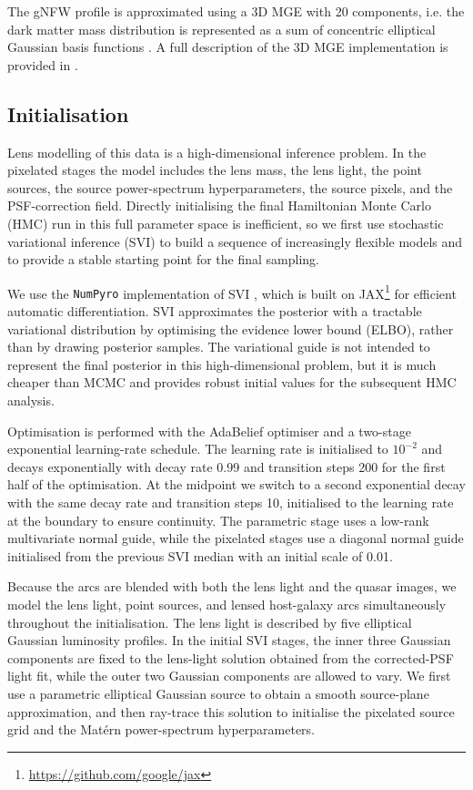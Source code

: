 \documentclass[fleqn,usenatbib]{mnras}
\begin{document}
The gNFW profile is approximated using a 3D MGE with 20 components, i.e. the dark matter mass distribution is represented as a sum of concentric elliptical Gaussian basis functions \citep{Emsellem1994_MGE, Cappellari2002_MGE, Shajib2019MGE}. A full description of the 3D MGE implementation is provided in \cite{Tian2026}.


\subsection{Initialisation}

Lens modelling of this data is a high-dimensional inference problem. In the pixelated stages the model includes the lens mass, the lens light, the point sources, the source power-spectrum hyperparameters, the source pixels, and the PSF-correction field. Directly initialising the final Hamiltonian Monte Carlo (HMC) run in this full parameter space is inefficient, so we first use stochastic variational inference (SVI) to build a sequence of increasingly flexible models and to provide a stable starting point for the final sampling.

We use the {\tt NumPyro} implementation of SVI \citep[see][]{WingateWeber2013}, which is built on JAX\footnote{\url{https://github.com/google/jax}} for efficient automatic differentiation. SVI approximates the posterior with a tractable variational distribution by optimising the evidence lower bound (ELBO), rather than by drawing posterior samples. The variational guide is not intended to represent the final posterior in this high-dimensional problem, but it is much cheaper than MCMC and provides robust initial values for the subsequent HMC analysis.

Optimisation is performed with the AdaBelief optimiser \citep{Zhuang2020} and a two-stage exponential learning-rate schedule. The learning rate is initialised to \(10^{-2}\) and decays exponentially with decay rate 0.99 and transition steps 200 for the first half of the optimisation. At the midpoint we switch to a second exponential decay with the same decay rate and transition steps 10, initialised to the learning rate at the boundary to ensure continuity. The parametric stage uses a low-rank multivariate normal guide, while the pixelated stages use a diagonal normal guide initialised from the previous SVI median with an initial scale of 0.01.

Because the arcs are blended with both the lens light and the quasar images, we model the lens light, point sources, and lensed host-galaxy arcs simultaneously throughout the initialisation. The lens light is described by five elliptical Gaussian luminosity profiles. In the initial SVI stages, the inner three Gaussian components are fixed to the lens-light solution obtained from the corrected-PSF light fit, while the outer two Gaussian components are allowed to vary. We first use a parametric elliptical Gaussian source to obtain a smooth source-plane approximation, and then ray-trace this solution to initialise the pixelated source grid and the Matérn power-spectrum hyperparameters.
\end{document}
